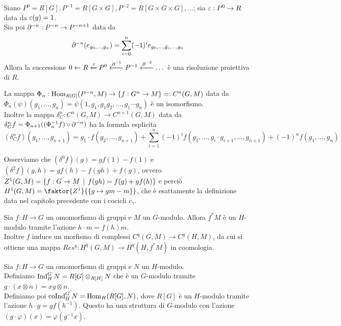 \begin{proposition}
    Siano $P^0=R[G],P^{-1}=R[G\times G],P^{-2}=R[G\times G\times G],\dots$; sia $\varepsilon:P^0\to R$ data da $\varepsilon(g)=1$.\\
    Sia poi $\partial^{-n}:P^{-n}\to P^{-n+1}$ data da $$\partial^{-n}(e_{g_0,\dots,g_n})=\sum_{i=0}^n (-1)^i e_{g_0,\dots,\hat{g_i},\dots,g_n}$$
    Allora la successione $0\leftarrow R\xleftarrow{\varepsilon} P^0\xleftarrow{\partial^{-1}}P^{-1}\xleftarrow{\partial^{-2}}\dots$ è una risoluzione proiettiva di $R$.
\end{proposition}

\begin{proposition}
    La mappa $\Phi_n:\operatorname{Hom}_{R[G]}(P^{-n},M)\to \{ f:G^n\to M \}=:C^n(G,M)$ data da $\Phi_n(\psi)(g_1,\dots,g_n)=\psi(1,g_1,g_1g_2,\dots,g_1\cdots g_n)$ è un isomorfismo.\\
    Inoltre la mappa $\delta_C^n:C^n(G,M)\to C^{n+1}(G,M)$ data da $\delta_C^n f=\Phi_{n+1}((\Phi_n^{-1}f)\circ\partial^{-n})$ ha la formula esplicita \begin{dmath*} (\delta_C^n f)(g_1,\dots,g_{n+1}) = g_1\cdot f(g_2,\dots,g_{n+1})+\sum_{i=1}^n (-1)^i f(g_1,\dots, g_i\cdot g_{i+1},\dots, g_{n+1})+(-1)^nf(g_1,\dots,g_n) \end{dmath*}
\end{proposition}

\begin{example}
    Osserviamo che $(\delta^0f)(g)=gf(1)-f(1)$ e $(\delta^2f)(g,h)=gf(h)-f(gh)+f(g)$, ovvero $Z^1(G,M)=\{ f:G\to M\operatorname{\; |\;} f(gh)=f(g)+gf(h) \}$ e perciò $H^1(G,M)=\faktor{Z^1}{ \{g\mapsto gm-m \} }$, che è esattamente la definizione data nel capitolo precedente con i cocicli $c_\gamma$.
\end{example}

\begin{definition}
    Sia $f:H\to G$ un omomorfismo di gruppi e $M$ un $G$-modulo. Allora $f^\ast M$ è un $H$-modulo tramite l'azione $h\cdot m=f(h)m$.\\
    Inoltre $f$ induce un morfismo di complessi $C^q(G,M)\to C^q(H,M)$, da cui si ottiene una mappa $Res^q: H^q(G,M)\to H^q(H,f^\ast M)$ in coomologia. \\
\end{definition}

\begin{definition}
        Sia $f:H\to G$ un omomorfismo di gruppi e $N$ un $H$-modulo.\\
        Definiamo $\operatorname{Ind}_H^G N=R[G]\otimes_{R[H]} N$ che è un $G$-modulo tramite $g\cdot(x\otimes n)=xg\otimes n$.\\
        Definiamo poi $\operatorname{coInd}_H^G N=\operatorname{Hom}_H(R[G],N)$, dove $R[G]$ è un $H$-modulo tramite l'azione $h\cdot g= gf(h^{-1})$. Questo ha una struttura di $G$-modulo con l'azione $(g\cdot\varphi)(x)=\varphi(g^{-1}x)$.
\end{definition}


